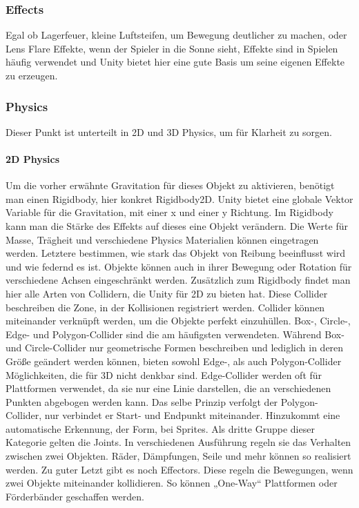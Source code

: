 \subsubsection{Effects}
Egal ob Lagerfeuer, kleine Luftsteifen, um Bewegung deutlicher zu machen, oder Lens Flare Effekte, wenn der Spieler in die Sonne sieht, Effekte sind in Spielen häufig verwendet und Unity bietet hier eine gute Basis um seine eigenen Effekte zu erzeugen.
\subsubsection{Physics}
Dieser Punkt ist unterteilt in 2D und 3D Physics, um für Klarheit zu sorgen.
\paragraph{2D Physics}
Um die vorher erwähnte Gravitation für dieses Objekt zu aktivieren, benötigt man einen Rigidbody, hier konkret Rigidbody2D. Unity bietet eine globale Vektor Variable für die Gravitation, mit einer x und einer y Richtung. Im Rigidbody kann man die Stärke des Effekts auf dieses eine Objekt verändern. Die Werte für Masse, Trägheit und verschiedene Physics Materialien können eingetragen werden. Letztere bestimmen, wie stark das Objekt von Reibung beeinflusst wird und wie federnd es ist. Objekte können auch in ihrer Bewegung oder Rotation für verschiedene Achsen eingeschränkt werden.
Zusätzlich zum Rigidbody findet man hier alle Arten von Collidern, die Unity für 2D zu bieten hat. Diese Collider beschreiben die Zone, in der Kollisionen registriert werden. Collider können miteinander verknüpft werden, um die Objekte perfekt einzuhüllen. Box-, Circle-, Edge- und Polygon-Collider sind die am häufigsten verwendeten. Während Box- und Circle-Collider nur geometrische Formen beschreiben und lediglich in deren Größe geändert werden können, bieten sowohl Edge-, als auch Polygon-Collider Möglichkeiten, die für 3D nicht denkbar sind. Edge-Collider werden oft für Plattformen verwendet, da sie nur eine Linie darstellen, die an verschiedenen Punkten abgebogen werden kann. Das selbe Prinzip verfolgt der Polygon-Collider, nur verbindet er Start- und Endpunkt miteinander. Hinzukommt eine automatische Erkennung, der Form, bei Sprites. 
Als dritte Gruppe dieser Kategorie gelten die Joints. In verschiedenen Ausführung regeln sie das Verhalten zwischen zwei Objekten. Räder, Dämpfungen, Seile und mehr können so realisiert werden.
Zu guter Letzt gibt es noch Effectors. Diese regeln die Bewegungen, wenn zwei Objekte miteinander kollidieren. So können „One-Way“ Plattformen oder Förderbänder geschaffen werden.
